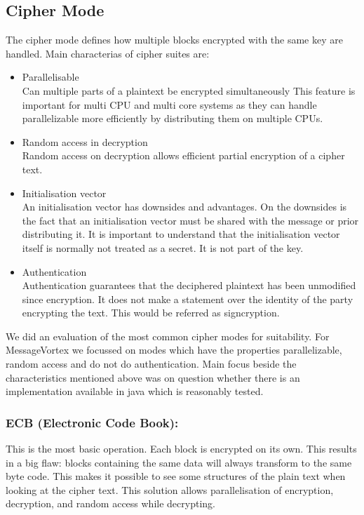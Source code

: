 \subsection{Cipher Mode}
The cipher mode defines how multiple blocks encrypted with the same key are handled. Main characterias of cipher suites are:
\begin{itemize}
	\item Parallelisable\\ 
	Can multiple parts of a plaintext be encrypted simultaneously This feature is important for multi CPU and multi core systems as they can handle parallelizable more efficiently by distributing them on multiple CPUs.
	\item Random access in decryption\\
	Random access on decryption allows efficient partial encryption of a cipher text.
	\item Initialisation vector\\
	An initialisation vector has downsides and advantages. On the downsides is the fact that an initialisation vector must be shared with the message or prior distributing it. It is important to understand that the initialisation vector itself is normally not treated as a secret. It is not part of the key.
	\item Authentication\\
	Authentication guarantees that the deciphered plaintext has been unmodified since encryption. It does not make a statement over the identity of the party encrypting the text. This would be referred as signcryption.
\end{itemize}

We did an evaluation of the most common cipher modes for suitability. For MessageVortex we focussed on modes which have the properties parallelizable, random access and do not do authentication. Main focus beside the characteristics mentioned above was on question whether there is an implementation available in java which is reasonably tested.

\subsubsection{ECB (Electronic Code Book):} This is the most basic operation. Each block is encrypted on its own. This results in a big flaw: blocks containing the same data will always transform to the same byte code. This makes it possible to see some structures of the plain text when looking at the cipher text. This solution allows parallelisation of encryption, decryption, and random access while decrypting.

